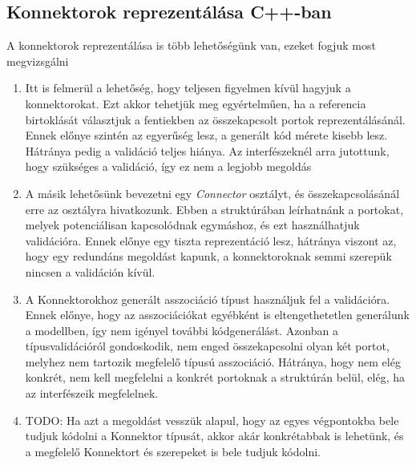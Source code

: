 \documentclass[a4paper,12pt]{report}
\begin{document}
\subsection{Konnektorok reprezentálása C++-ban}
A konnektorok reprezentálása is több lehetőségünk van, ezeket fogjuk most megvizsgálni
\begin{enumerate}
\item Itt is felmerül a lehetőség, hogy teljesen figyelmen kívül hagyjuk a konnektorokat. Ezt akkor tehetjük meg egyértelműen, ha a referencia birtoklását választjuk a fentiekben az összekapcsolt portok reprezentálásánál. Ennek előnye szintén az egyerűség lesz, a generált kód mérete kisebb lesz. Hátránya pedig a validáció teljes hiánya. Az interfészeknél arra jutottunk, hogy szükséges a validáció, így ez nem a legjobb megoldás
\item A másik lehetősünk bevezetni egy \textit{Connector} osztályt, és összekapcsolásánál erre az osztályra hivatkozunk. Ebben a struktúrában leírhatnánk a portokat, melyek potenciálisan kapcsolódnak egymáshoz, és ezt használhatjuk validációra. Ennek előnye egy tiszta reprezentáció lesz, hátránya viszont az, hogy egy redundáns megoldást kapunk, a konnektoroknak semmi szerepük nincsen a validáción kívül.
\item A Konnektorokhoz generált asszociáció típust használjuk fel a validációra. Ennek előnye, hogy az asszociációkat egyébként is eltengethetetlen generálunk a modellben, így nem igényel további kódgenerálást. Azonban a típusvalidációról gondoskodik, nem enged összekapcsolni olyan két portot, melyhez nem tartozik megfelelő típusú asszociáció. Hátránya, hogy nem elég konkrét, nem kell megfelelni a konkrét portoknak a struktúrán belül, elég, ha az interfészeik megfelelnek.
\item TODO: Ha azt a megoldást vesszük alapul, hogy az egyes végpontokba bele tudjuk kódolni a Konnektor típusát, akkor akár konkrétabbak is lehetünk, és a megfelelő Konnektort és szerepeket is bele tudjuk kódolni.
\end{enumerate}
\end{document}
